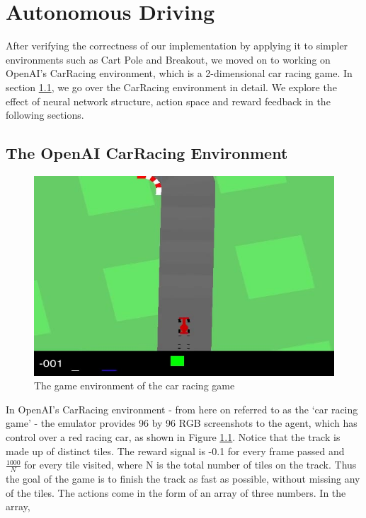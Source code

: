 \chapter{Autonomous Driving}\label{Ch:ResultsCarRacing}

After verifying the correctness of our implementation by applying it
to simpler environments such as Cart Pole and Breakout, we moved on to
working on OpenAI's CarRacing environment, which is a 2-dimensional
car racing game. In section \ref{sec1}, we go over the CarRacing
environment in detail. We explore the effect of neural network
structure, action space and reward feedback in the following sections.  

\section{The OpenAI CarRacing Environment}\label{sec1}
\begin{figure}[h!]
\centering\includegraphics[scale=0.45,clip]{Graphics/carracing.jpg}
\caption[Car Racing]{The game environment of the car racing game}
\label{fig:carracing}
\end{figure}
In OpenAI's CarRacing environment - from here on referred to as the
`car racing game' - the emulator provides 96 by 96 RGB screenshots to
the agent, which has control over a red racing car, as shown in Figure
\ref{fig:carracing}. Notice that the track is made up of distinct
tiles. The reward signal is -0.1 for every frame passed and
$\frac{1000}{N}$ for every tile visited, where N is the total number
of tiles on the track. Thus the goal of the game is to finish the
track as fast as possible, without missing any of the tiles. The
actions come in the form of an array of three numbers. In the array,
